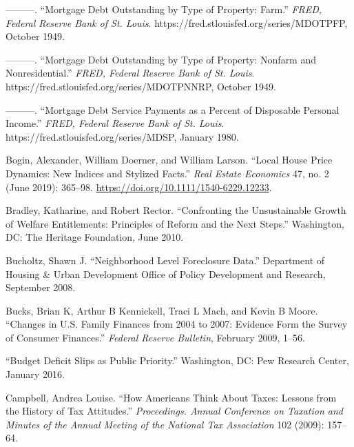 \documentclass[12pt,oneside]{psthesis}
\begin{document}
\leavevmode\hypertarget{ref-boardofgovernorsofthefederalreservesystemus1949mortgagea}{}%
---------. ``Mortgage Debt Outstanding by Type of Property: Farm.'' \emph{FRED, Federal Reserve Bank of St. Louis}. https://fred.stlouisfed.org/series/MDOTPFP, October 1949.

\leavevmode\hypertarget{ref-boardofgovernorsofthefederalreservesystemus1949mortgageb}{}%
---------. ``Mortgage Debt Outstanding by Type of Property: Nonfarm and Nonresidential.'' \emph{FRED, Federal Reserve Bank of St. Louis}. https://fred.stlouisfed.org/series/MDOTPNNRP, October 1949.

\leavevmode\hypertarget{ref-boardofgovernorsofthefederalreservesystemus1980mortgage}{}%
---------. ``Mortgage Debt Service Payments as a Percent of Disposable Personal Income.'' \emph{FRED, Federal Reserve Bank of St. Louis}. https://fred.stlouisfed.org/series/MDSP, January 1980.

\leavevmode\hypertarget{ref-bogin2019local}{}%
Bogin, Alexander, William Doerner, and William Larson. ``Local House Price Dynamics: New Indices and Stylized Facts.'' \emph{Real Estate Economics} 47, no. 2 (June 2019): 365--98. \url{https://doi.org/10.1111/1540-6229.12233}.

\leavevmode\hypertarget{ref-bradley2010confronting}{}%
Bradley, Katharine, and Robert Rector. ``Confronting the Unsustainable Growth of Welfare Entitlements: Principles of Reform and the Next Steps.'' Washington, DC: The Heritage Foundation, June 2010.

\leavevmode\hypertarget{ref-bucholtz2008neighborhood}{}%
Bucholtz, Shawn J. ``Neighborhood Level Foreclosure Data.'' Department of Housing \& Urban Development Office of Policy Development and Research, September 2008.

\leavevmode\hypertarget{ref-bucks2009changes}{}%
Bucks, Brian K, Arthur B Kennickell, Traci L Mach, and Kevin B Moore. ``Changes in U.S. Family Finances from 2004 to 2007: Evidence Form the Survey of Consumer Finances.'' \emph{Federal Reserve Bulletin}, February 2009, 1--56.

\leavevmode\hypertarget{ref-2016budget}{}%
``Budget Deficit Slips as Public Priority.'' Washington, DC: Pew Research Center, January 2016.

\leavevmode\hypertarget{ref-campbell2009how}{}%
Campbell, Andrea Louise. ``How Americans Think About Taxes: Lessons from the History of Tax Attitudes.'' \emph{Proceedings. Annual Conference on Taxation and Minutes of the Annual Meeting of the National Tax Association} 102 (2009): 157--64.
\end{document}
